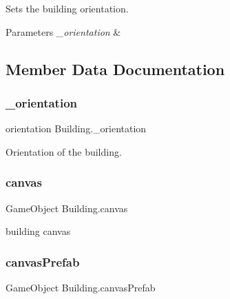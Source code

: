 Sets the building orientation. 


\begin{DoxyParams}{Parameters}
{\em \+\_\+orientation} & \\
\hline
\end{DoxyParams}


\subsection{Member Data Documentation}
\mbox{\label{class_building_af17fc4832a9e36f5ea3891f486138fc6}} 
\subsubsection{\texorpdfstring{\+\_\+orientation}{\_orientation}}
{\footnotesize\ttfamily orientation Building.\+\_\+orientation\hspace{0.3cm}{\ttfamily [protected]}}



Orientation of the building. 

\mbox{\label{class_building_a404053cc6bb26179c3ffacba529323ab}} 
\subsubsection{\texorpdfstring{canvas}{canvas}}
{\footnotesize\ttfamily Game\+Object Building.\+canvas\hspace{0.3cm}{\ttfamily [protected]}}



building canvas 

\mbox{\label{class_building_a8a0f028fd434f39eec8a5d3f5f6df82d}} 
\subsubsection{\texorpdfstring{canvas\+Prefab}{canvasPrefab}}
{\footnotesize\ttfamily Game\+Object Building.\+canvas\+Prefab\hspace{0.3cm}{\ttfamily [protected]}}



